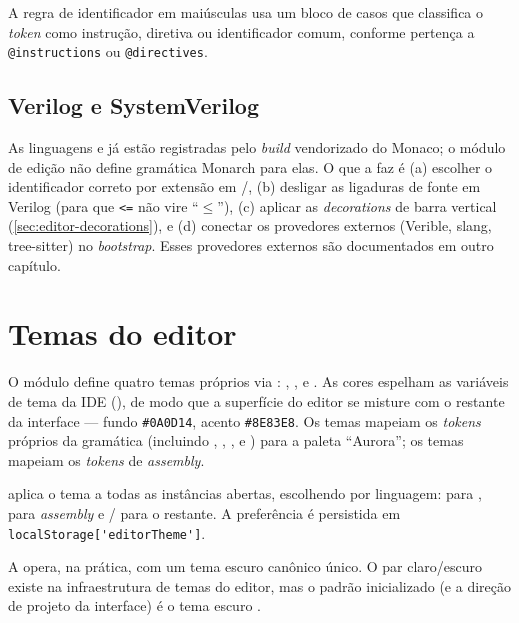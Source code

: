 \noindent
A regra de identificador em maiúsculas usa um bloco de casos que classifica o
\emph{token} como instrução, diretiva ou identificador comum, conforme pertença a
\lstinline|@instructions| ou \lstinline|@directives|.

\subsection{Verilog e SystemVerilog}
\label{sec:editor-verilog}

As linguagens  e  já estão registradas pelo
\emph{build} vendorizado do Monaco; o módulo de edição não define gramática
Monarch para elas. O que a  faz é (a) escolher o identificador
correto por extensão em /, (b)
desligar as ligaduras de fonte em Verilog (para que \lstinline|<=| não vire
\enquote{$\leq$}), (c) aplicar as \emph{decorations} de barra vertical
(\autoref{sec:editor-decorations}), e (d) conectar os provedores externos
(Verible, slang, tree-sitter) no \emph{bootstrap}. Esses provedores externos são
documentados em outro capítulo.

\section{Temas do editor}
\label{sec:editor-themes}

O módulo define quatro temas próprios via :
, ,  e . As cores
espelham as variáveis de tema da IDE (), de modo que a
superfície do editor se misture com o restante da interface --- fundo
\lstinline|#0A0D14|, acento \lstinline|#8E83E8|. Os temas  mapeiam os
\emph{tokens} próprios da gramática \cmm{} (incluindo ,
, ,
 e ) para a paleta
\enquote{Aurora}; os temas  mapeiam os \emph{tokens} de
\emph{assembly}.

 aplica o tema a todas as instâncias abertas, escolhendo
por linguagem:  para \cmm{},  para \emph{assembly} e
/ para o restante. A preferência é persistida em
\lstinline|localStorage['editorTheme']|.

\begin{nota}
A  opera, na prática, com um tema escuro canônico único. O par
claro/escuro existe na infraestrutura de temas do editor, mas o padrão
inicializado (e a direção de projeto da interface) é o tema escuro
.
\end{nota}

